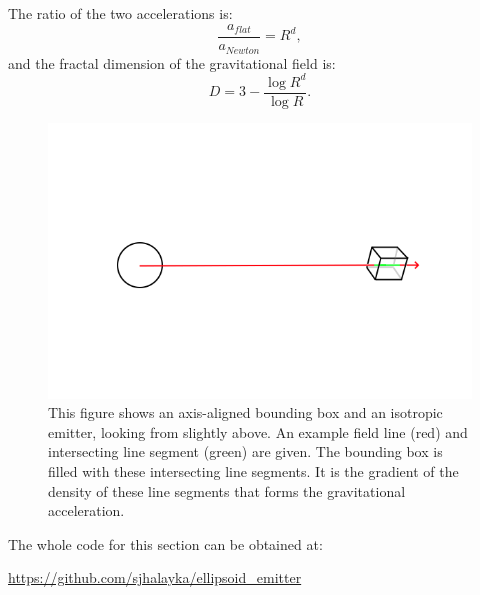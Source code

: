 \documentclass[12pt]{article}
\begin{document}
The ratio of the two accelerations is:
\begin{equation}
\frac{a_{\textit{flat}}}{a_{\textit{Newton}}} = R^{d}, 
\end{equation}
and the fractal dimension of the gravitational field is:
\begin{equation}
D = 3 - \frac{\log R^d}{\log R}. %
\end{equation}

\begin{figure} 
\centering
\label{fig1}
  \includegraphics[width = 7 in]{AABB.png}
  \caption{
This figure shows an axis-aligned bounding box and an isotropic emitter, looking from slightly above.
An example field line (red) and intersecting line segment (green) are given.
The bounding box is filled with these intersecting line segments.
It is the gradient of the density of these line segments that forms the gravitational acceleration.
}
\end{figure}

The whole code for this section can be obtained at:

\url{https://github.com/sjhalayka/ellipsoid_emitter}
\end{document}
